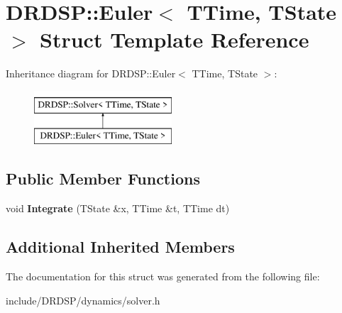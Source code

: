 \hypertarget{struct_d_r_d_s_p_1_1_euler}{\section{D\-R\-D\-S\-P\-:\-:Euler$<$ T\-Time, T\-State $>$ Struct Template Reference}
\label{struct_d_r_d_s_p_1_1_euler}
}
Inheritance diagram for D\-R\-D\-S\-P\-:\-:Euler$<$ T\-Time, T\-State $>$\-:\begin{figure}[H]
\begin{center}
\leavevmode
\includegraphics[height=2.000000cm]{struct_d_r_d_s_p_1_1_euler}
\end{center}
\end{figure}
\subsection*{Public Member Functions}
\begin{DoxyCompactItemize}
\item 
\hypertarget{struct_d_r_d_s_p_1_1_euler_acb158bee2c2c68dc9fbd697375b7c5c9}{void {\bfseries Integrate} (T\-State \&x, T\-Time \&t, T\-Time dt)}\label{struct_d_r_d_s_p_1_1_euler_acb158bee2c2c68dc9fbd697375b7c5c9}

\end{DoxyCompactItemize}
\subsection*{Additional Inherited Members}


The documentation for this struct was generated from the following file\-:\begin{DoxyCompactItemize}
\item 
include/\-D\-R\-D\-S\-P/dynamics/solver.\-h\end{DoxyCompactItemize}
